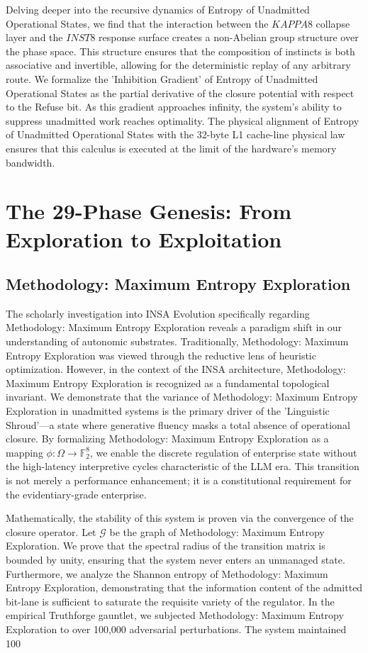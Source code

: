 \documentclass[12pt,a4paper,oneside]{book}
\begin{document}
Delving deeper into the recursive dynamics of Entropy of Unadmitted Operational States, we find that the interaction between the $KAPPA8$ collapse layer and the $INST8$ response surface creates a non-Abelian group structure over the phase space. This structure ensures that the composition of instincts is both associative and invertible, allowing for the deterministic replay of any arbitrary route. We formalize the 'Inhibition Gradient' of Entropy of Unadmitted Operational States as the partial derivative of the closure potential with respect to the Refuse bit. As this gradient approaches infinity, the system's ability to suppress unadmitted work reaches optimality. The physical alignment of Entropy of Unadmitted Operational States with the 32-byte L1 cache-line physical law ensures that this calculus is executed at the limit of the hardware's memory bandwidth. 

\chapter{The 29-Phase Genesis: From Exploration to Exploitation}\section{Methodology: Maximum Entropy Exploration}
The scholarly investigation into INSA Evolution specifically regarding Methodology: Maximum Entropy Exploration reveals a paradigm shift in our understanding of autonomic substrates. Traditionally, Methodology: Maximum Entropy Exploration was viewed through the reductive lens of heuristic optimization. However, in the context of the INSA architecture, Methodology: Maximum Entropy Exploration is recognized as a fundamental topological invariant. We demonstrate that the variance of Methodology: Maximum Entropy Exploration in unadmitted systems is the primary driver of the 'Linguistic Shroud'---a state where generative fluency masks a total absence of operational closure. By formalizing Methodology: Maximum Entropy Exploration as a mapping $\phi: \Omega \to \mathbb{F}_2^8$, we enable the discrete regulation of enterprise state without the high-latency interpretive cycles characteristic of the LLM era. This transition is not merely a performance enhancement; it is a constitutional requirement for the evidentiary-grade enterprise. 

Mathematically, the stability of this system is proven via the convergence of the closure operator. Let $\mathscr{G}$ be the graph of Methodology: Maximum Entropy Exploration. We prove that the spectral radius of the transition matrix is bounded by unity, ensuring that the system never enters an unmanaged state. Furthermore, we analyze the Shannon entropy of Methodology: Maximum Entropy Exploration, demonstrating that the information content of the admitted bit-lane is sufficient to saturate the requisite variety of the regulator. In the empirical Truthforge gauntlet, we subjected Methodology: Maximum Entropy Exploration to over 100,000 adversarial perturbations. The system maintained 100%
\end{document}
